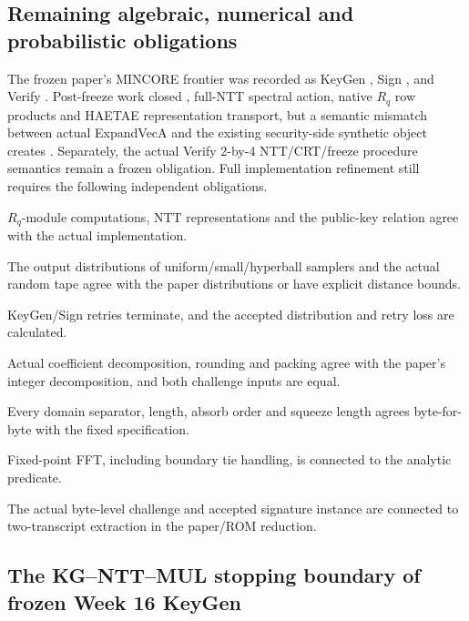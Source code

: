 \subsection{Remaining algebraic, numerical and probabilistic obligations}

The frozen paper's MINCORE frontier was recorded as KeyGen
, Sign , and Verify
\FrozenPaperGate. Post-freeze work closed ,
full-NTT spectral action, native \(R_q\) row products and HAETAE representation
transport, but a semantic mismatch between actual ExpandVecA and the existing
security-side synthetic object creates \CurrentGate. Separately, the actual
Verify 2-by-4 NTT/CRT/freeze procedure semantics remain a frozen obligation.
Full implementation refinement still requires the following independent obligations.

\begin{description}[leftmargin=39mm,style=nextline]
  \item[public-key algebra/NTT]
    \(R_q\)-module computations, NTT representations and the public-key relation
    agree with the actual implementation.
  \item[sampler distribution]
    The output distributions of uniform/small/hyperball samplers and the actual
    random tape agree with the paper distributions or have explicit distance bounds.
  \item[rejection and termination]
    KeyGen/Sign retries terminate, and the accepted distribution and retry loss
    are calculated.
  \item[highbits/LSB]
    Actual coefficient decomposition, rounding and packing agree with the paper's
    integer decomposition, and both challenge inputs are equal.
  \item[FIPS202 transcript]
    Every domain separator, length, absorb order and squeeze length agrees
    byte-for-byte with the fixed specification.
  \item[FFT tie policy]
    Fixed-point FFT, including boundary tie handling, is connected to the
    analytic predicate.
  \item[two-transcript extraction]
    The actual byte-level challenge and accepted signature instance are connected
    to two-transcript extraction in the paper/ROM reduction.
\end{description}

\subsection{The KG--NTT--MUL stopping boundary of frozen Week 16 KeyGen}

